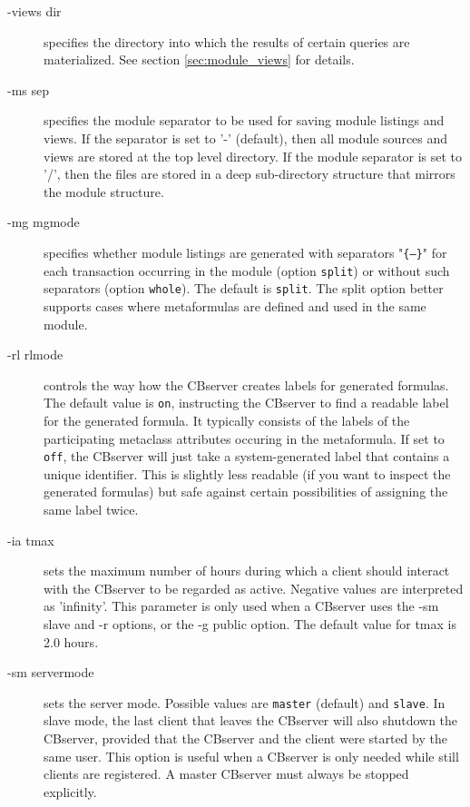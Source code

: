 \begin{description}
\item[-views dir] specifies the directory into which the results of certain
queries are materialized. See section \ref{sec:module_views} for details.

\item[-ms sep] specifies the module separator to be used for saving module listings
and views. If the separator is set to '-'  (default), then all module sources and
views are stored at the top level directory. If the module separator is set to '/',
then the files are stored in a deep sub-directory structure that mirrors the module
structure.

\item[-mg mgmode] specifies whether module listings are generated with separators
"{\tt \{---\}}" for each transaction occurring in the module (option {\tt split}) or
without such separators
(option {\tt whole}). The default is {\tt split}. The split option better supports
cases where metaformulas are defined and used in the same module.

\item[-rl rlmode] controls the way how the CBserver creates labels for generated formulas.
The default value is {\tt on}, instructing the CBserver to find a readable 
label for the generated formula. It typically consists of the labels of
the participating metaclass attributes occuring in the metaformula. 
If set to {\tt off}, the CBserver will just take a system-generated label that contains
a unique identifier. This is slightly less readable (if you want to inspect
the generated formulas) but safe against certain possibilities of assigning
the same label twice.

\item[-ia tmax] sets the maximum number of hours during which a client should
interact with the CBserver to be regarded as active. Negative values
are interpreted as 'infinity'. This parameter is only used when a CBserver
uses the -sm slave and -r options, or the -g public option.
The default value for tmax is 2.0 hours.

\item[-sm servermode] sets the server mode. Possible values are
{\tt master} (default) and {\tt slave}. In slave mode, the last client that
leaves the CBserver will also shutdown the CBserver, provided that the CBserver
and the client were started by the same user. This option is useful when
a CBserver is only needed while still clients are registered. A master
CBserver must always be stopped explicitly.


\end{description}
